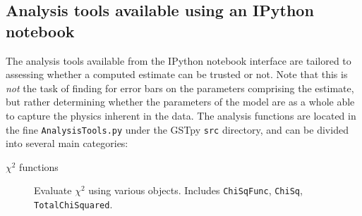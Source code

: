 \documentclass{article}[11pt]
\begin{document}
\subsection{Analysis tools available using an IPython notebook}
The analysis tools available from the IPython notebook interface are tailored to assessing whether a computed estimate can be trusted or not.  Note that this is \emph{not} the task of finding for error bars on the parameters comprising the estimate, but rather determining whether the parameters of the model are as a whole able to capture the physics inherent in the data. The analysis functions are located in the fine \texttt{AnalysisTools.py} under the GSTpy \texttt{src} directory, and can be divided into several main categories:
\begin{description}

\item[$\chi^2$ functions] Evaluate $\chi^2$ using various objects.  Includes \texttt{ChiSqFunc}, \texttt{ChiSq}, \texttt{TotalChiSquared}.


\end{description}
\end{document}
